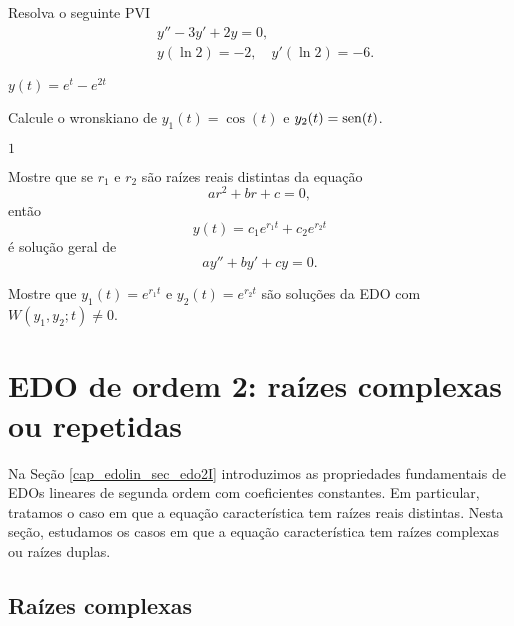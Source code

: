 \begin{exer}
  Resolva o seguinte PVI
  \begin{align}
    &y'' - 3y' + 2y = 0,\\
    &y(\ln 2) = -2,\quad y'(\ln 2) = -6.
  \end{align}
\end{exer}
\begin{resp}
  $y(t) = e^t - e^{2t}$
\end{resp}

\begin{exer}
  Calcule o wronskiano de $y_1(t) = \cos(t)$ e $y_2(t) = \operatorname{sen}(t)$.
\end{exer}
\begin{resp}
  $1$
\end{resp}

\begin{exer}
  Mostre que se $r_1$ e $r_2$ são raízes reais distintas da equação
  \begin{equation}
    ar^2 + br + c = 0,
  \end{equation}
  então
  \begin{equation}
    y(t) = c_1e^{r_1t} + c_2e^{r_2t}
  \end{equation}
  é solução geral de
  \begin{equation}
    ay'' + by' + cy = 0.
  \end{equation}
\end{exer}
\begin{resp}
  Mostre que $y_1(t) = e^{r_1t}$ e $y_2(t) = e^{r_2t}$ são soluções da EDO com $W(y_1,y_2; t) \neq 0$.
\end{resp}


\section{EDO de ordem 2: raízes complexas ou repetidas}\label{cap_edolin_sec_edo2II}

Na Seção \ref{cap_edolin_sec_edo2I} introduzimos as propriedades fundamentais de EDOs lineares de segunda ordem com coeficientes constantes. Em particular, tratamos o caso em que a equação característica tem raízes reais distintas. Nesta seção, estudamos os casos em que a equação característica tem raízes complexas ou raízes duplas.

\subsection{Raízes complexas}

